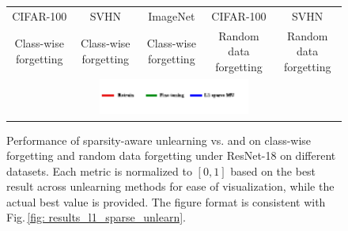 \begin{figure}[htb]
{\begin{tabular}{ccccc}
\\
\scriptsize{CIFAR-100} & \scriptsize{SVHN} & \scriptsize{ImageNet} & \scriptsize{CIFAR-100} & \scriptsize{SVHN} \\
\scriptsize{Class-wise forgetting} & \scriptsize{Class-wise forgetting} & \scriptsize{Class-wise forgetting} & \scriptsize{Random data forgetting} & \scriptsize{Random data forgetting}
 \\
\multicolumn{5}{c}{\includegraphics[width=50mm,height=!]{figs/legend.pdf}}\\
\end{tabular}}
\vspace*{-1.5mm}
\caption{
Performance   of sparsity-aware unlearning vs. {\FT} and {\retrain} on class-wise forgetting and random data forgetting under ResNet-18 on different datasets. 
 Each metric is normalized to $[0,1]$ based on the best result  across unlearning methods for ease of visualization, while the actual best value is provided. The figure format is consistent with Fig.\,\ref{fig: results_l1_sparse_unlearn}.
}
  \label{fig: results_l1_sparse_unlearn_others}
\vspace*{-5mm}
\end{figure}



